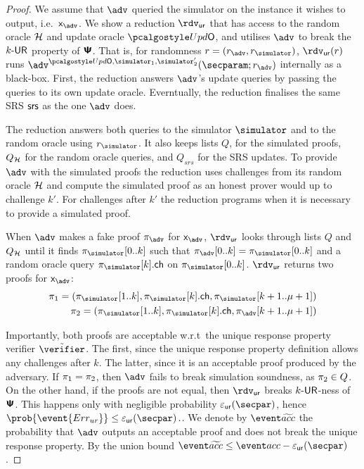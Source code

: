 \begin{proof}
	We assume that $\adv$ queried the simulator on the instance it wishes to
	output, i.e.~$\inp_{\adv}$. We show a reduction $\rdvur$ that has access to the random oracle $\mathcal{H}$ and update oracle $\initU$, and utilises $\adv$ to break the ${k\text{-}\mathsf{UR}}$ property of $\bm{\mathsf{\Psi}}$. That is, for randomness $r = (r_\adv, \rsim)$, $\rdvur (r)$ runs $\advse^{\initU, \simulator_1, \simulator_2'}(\secparam; r_\adv)$ internally as a black-box.
	First, the reduction answers $\adv$'s update queries by passing the queries to its own update oracle. Everntually, the reduction finalises the same SRS $\mathsf{srs}$ as the one $\adv$ does.
	
	The reduction answers both queries to the simulator $\simulator$ and to the random oracle using $\rsim$. It also keeps lists $Q$, for the simulated proofs, $Q_{\mathcal{H}}$ for the random oracle queries, and $Q_{srs}$ for the SRS updates. To provide $\adv$ with the simulated proofs the reduction uses challenges from its random oracle $\mathcal{H}$ and compute the simulated proof as an honest prover would up to challenge $k'$. For challenges after $k'$ the reduction programs when it is necessary to provide a simulated proof.

	When $\adv$ makes a fake proof $\zkproof_{\adv}$ for $\inp_{\adv}$, $\rdvur$
		looks through lists $Q$ and $Q_{\mathcal{H}}$ until it finds $\zkproof_{\simulator}[0..k]$
		such that $\zkproof_{\adv}[0..k] = \zkproof_{\simulator}[0..k]$ and a random
		oracle query $\zkproof_{\simulator}[k].\ch$ on $\zkproof_{\simulator}[0..k]$.
	$\rdvur$ returns two proofs for $\inp_{\adv}$:
		\begin{align*}
		\zkproof_1 = (\zkproof_{\simulator}[1..k],
		\zkproof_{\simulator}[k].\ch, \zkproof_{\simulator}[k + 1..\mu + 1])\\
		\zkproof_2 = (\zkproof_{\simulator}[1..k],
		\zkproof_{\simulator}[k].\ch, \zkproof_{\adv}[k + 1..\mu + 1])
		\end{align*}

	Importantly, both proofs are acceptable w.r.t~the unique response property verifier $\tilde{\verifier}$. The first, since the unique response property definition allows any challenges after $k$. The latter, since it is an acceptable proof produced by the adversary.
	If $\pi_1 = \pi_2$, then $\adv$ fails to break simulation soundness, as
	$\pi_2 \in Q$. On the other hand, if the proofs are not equal, then $\rdvur$
	breaks ${k\text{-}\mathsf{UR}}$-ness of $\bm{\mathsf{\Psi}}$. This happens only with negligible probability
	$\epsur(\secpar)$, hence \( \prob{\event{\errur}} \leq \epsur(\secpar)\,. \). We denote by $\waccProb$ the probability that $\adv$ outputs an acceptable proof and does not break the unique response property. By the union bound $\waccProb \leq \accProb - \epsur (\secpar)$.


\end{proof}
